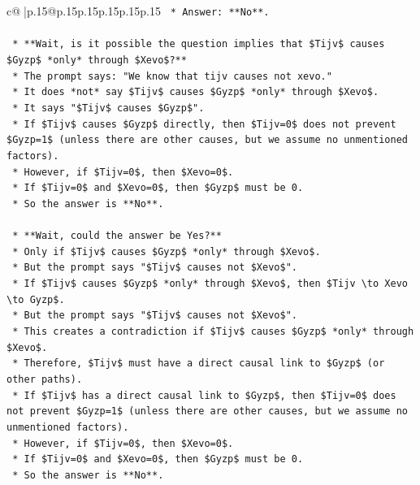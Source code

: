 \documentclass{article}
\begin{document}
{\begin{supertabular}{c@{$\;$}|p{.15\linewidth}@{}p{.15\linewidth}p{.15\linewidth}p{.15\linewidth}p{.15\linewidth}p{.15\linewidth}}
{{{\texttt{        *   Answer: **No**.} \\
\\ 
\texttt{    *   **Wait, is it possible the question implies that \$Tijv\$ causes \$Gyzp\$ *only* through \$Xevo\$?**} \\
\texttt{        *   The prompt says: "We know that tijv causes not xevo."} \\
\texttt{        *   It does *not* say \$Tijv\$ causes \$Gyzp\$ *only* through \$Xevo\$.} \\
\texttt{        *   It says "\$Tijv\$ causes \$Gyzp\$".} \\
\texttt{        *   If \$Tijv\$ causes \$Gyzp\$ directly, then \$Tijv=0\$ does not prevent \$Gyzp=1\$ (unless there are other causes, but we assume no unmentioned factors).} \\
\texttt{        *   However, if \$Tijv=0\$, then \$Xevo=0\$.} \\
\texttt{        *   If \$Tijv=0\$ and \$Xevo=0\$, then \$Gyzp\$ must be 0.} \\
\texttt{        *   So the answer is **No**.} \\
\\ 
\texttt{    *   **Wait, could the answer be Yes?**} \\
\texttt{        *   Only if \$Tijv\$ causes \$Gyzp\$ *only* through \$Xevo\$.} \\
\texttt{        *   But the prompt says "\$Tijv\$ causes not \$Xevo\$".} \\
\texttt{        *   If \$Tijv\$ causes \$Gyzp\$ *only* through \$Xevo\$, then \$Tijv \textbackslash{}to Xevo \textbackslash{}to Gyzp\$.} \\
\texttt{        *   But the prompt says "\$Tijv\$ causes not \$Xevo\$".} \\
\texttt{        *   This creates a contradiction if \$Tijv\$ causes \$Gyzp\$ *only* through \$Xevo\$.} \\
\texttt{        *   Therefore, \$Tijv\$ must have a direct causal link to \$Gyzp\$ (or other paths).} \\
\texttt{        *   If \$Tijv\$ has a direct causal link to \$Gyzp\$, then \$Tijv=0\$ does not prevent \$Gyzp=1\$ (unless there are other causes, but we assume no unmentioned factors).} \\
\texttt{        *   However, if \$Tijv=0\$, then \$Xevo=0\$.} \\
\texttt{        *   If \$Tijv=0\$ and \$Xevo=0\$, then \$Gyzp\$ must be 0.} \\
\texttt{        *   So the answer is **No**.} \\
}}}
\end{supertabular}}
\end{document}

